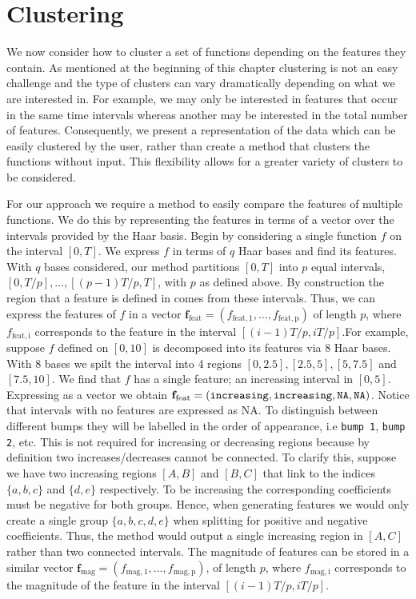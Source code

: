\documentclass[../main.tex]{subfiles}
\begin{document}
\section{Clustering} 
We now consider how to cluster a set of functions depending on the features they contain. As mentioned at the beginning of this chapter clustering is not an easy challenge and the type of clusters can vary dramatically depending on what we are interested in. For example, we may only be interested in features that occur in the same time intervals whereas another may be interested in the total number of features. Consequently, we present a representation of the data which can be easily clustered by the user, rather than create a method that clusters the functions without input. This flexibility allows for a greater variety of clusters to be considered. 



For our approach we require a method to easily compare the features of multiple functions. We do this by representing the features in terms of a vector over the intervals provided by the Haar basis. Begin by considering a single function $f$ on the interval $[0,T]$. We express $f$ in terms of $q$ Haar bases and find its features. With $q$ bases considered, our method partitions $[0,T]$ into $p$ equal intervals, $[0,T/p], \dots, [(p-1)T/p, T]$, with $p$ as defined above. By construction the region that a feature is defined in comes from these intervals. Thus, we can express the features of $f$ in a vector $\mathbf{f}_{\mathrm{feat}} = (f_{\mathrm{feat,1}} , \dots, f_{\mathrm{feat,p}})$ of length $p$, where $f_{\mathrm{feat,i}}$ corresponds to the feature in the interval $[(i-1)T/p,iT/p]$.For example, suppose $f$ defined on $[0,10]$ is decomposed into its features via 8 Haar bases. With 8 bases we spilt the interval into 4 regions $[0,2.5], [2.5,5], [5,7.5]$ and $[7.5,10]$. We find that $f$ has a single feature; an increasing interval in $[0,5]$. Expressing as a vector we obtain $\mathbf{f}_{\mathrm{feat}} = (\tt{increasing},\tt{increasing},\tt{NA} ,\tt{NA})$. Notice that intervals with no features are expressed as NA. To distinguish between different bumps they will be labelled in the order of appearance, i.e {\tt bump 1}, {\tt bump 2}, etc. This is not required for increasing or decreasing regions because by definition two increases/decreases cannot be connected. To clarify this, suppose we have two increasing regions $[A,B]$ and $[B,C]$ that link to the indices $\{a,b,c\}$ and $\{d,e\}$ respectively. To be increasing the corresponding coefficients must be negative for both groups. Hence, when generating features we would only create a single group $\{a,b,c,d,e\}$ when splitting for positive and negative coefficients. Thus, the method would output a single increasing region in $[A,C]$ rather than two connected intervals. The magnitude of features can be stored in a similar vector $\mathbf{f}_{\mathrm{mag}}= (f_{\mathrm{mag,1}} , \dots, f_{\mathrm{mag,p}})$, of length $p$, where $f_{\mathrm{mag,i}}$ corresponds to the magnitude of the feature in the interval $[(i-1)T/p,iT/p]$.
\end{document}
